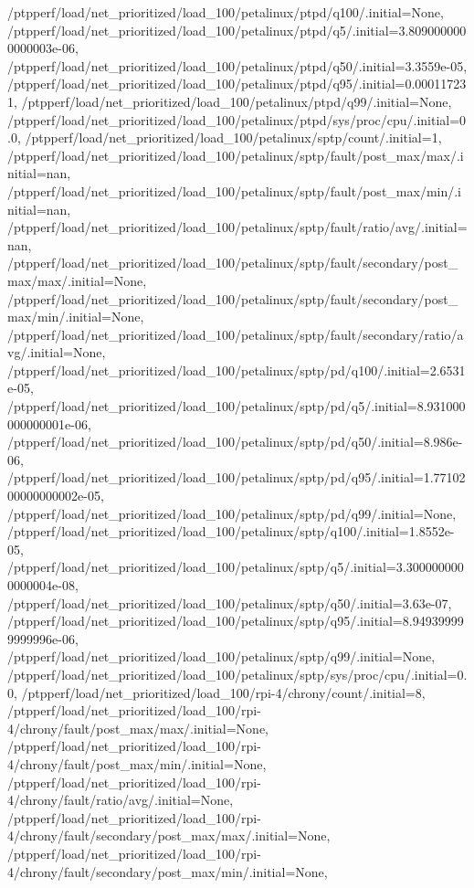 {    /ptpperf/load/net_prioritized/load_100/petalinux/ptpd/q100/.initial=None,
    /ptpperf/load/net_prioritized/load_100/petalinux/ptpd/q5/.initial=3.8090000000000003e-06,
    /ptpperf/load/net_prioritized/load_100/petalinux/ptpd/q50/.initial=3.3559e-05,
    /ptpperf/load/net_prioritized/load_100/petalinux/ptpd/q95/.initial=0.000117231,
    /ptpperf/load/net_prioritized/load_100/petalinux/ptpd/q99/.initial=None,
    /ptpperf/load/net_prioritized/load_100/petalinux/ptpd/sys/proc/cpu/.initial=0.0,
    /ptpperf/load/net_prioritized/load_100/petalinux/sptp/count/.initial=1,
    /ptpperf/load/net_prioritized/load_100/petalinux/sptp/fault/post_max/max/.initial=nan,
    /ptpperf/load/net_prioritized/load_100/petalinux/sptp/fault/post_max/min/.initial=nan,
    /ptpperf/load/net_prioritized/load_100/petalinux/sptp/fault/ratio/avg/.initial=nan,
    /ptpperf/load/net_prioritized/load_100/petalinux/sptp/fault/secondary/post_max/max/.initial=None,
    /ptpperf/load/net_prioritized/load_100/petalinux/sptp/fault/secondary/post_max/min/.initial=None,
    /ptpperf/load/net_prioritized/load_100/petalinux/sptp/fault/secondary/ratio/avg/.initial=None,
    /ptpperf/load/net_prioritized/load_100/petalinux/sptp/pd/q100/.initial=2.6531e-05,
    /ptpperf/load/net_prioritized/load_100/petalinux/sptp/pd/q5/.initial=8.931000000000001e-06,
    /ptpperf/load/net_prioritized/load_100/petalinux/sptp/pd/q50/.initial=8.986e-06,
    /ptpperf/load/net_prioritized/load_100/petalinux/sptp/pd/q95/.initial=1.7710200000000002e-05,
    /ptpperf/load/net_prioritized/load_100/petalinux/sptp/pd/q99/.initial=None,
    /ptpperf/load/net_prioritized/load_100/petalinux/sptp/q100/.initial=1.8552e-05,
    /ptpperf/load/net_prioritized/load_100/petalinux/sptp/q5/.initial=3.3000000000000004e-08,
    /ptpperf/load/net_prioritized/load_100/petalinux/sptp/q50/.initial=3.63e-07,
    /ptpperf/load/net_prioritized/load_100/petalinux/sptp/q95/.initial=8.949399999999996e-06,
    /ptpperf/load/net_prioritized/load_100/petalinux/sptp/q99/.initial=None,
    /ptpperf/load/net_prioritized/load_100/petalinux/sptp/sys/proc/cpu/.initial=0.0,
    /ptpperf/load/net_prioritized/load_100/rpi-4/chrony/count/.initial=8,
    /ptpperf/load/net_prioritized/load_100/rpi-4/chrony/fault/post_max/max/.initial=None,
    /ptpperf/load/net_prioritized/load_100/rpi-4/chrony/fault/post_max/min/.initial=None,
    /ptpperf/load/net_prioritized/load_100/rpi-4/chrony/fault/ratio/avg/.initial=None,
    /ptpperf/load/net_prioritized/load_100/rpi-4/chrony/fault/secondary/post_max/max/.initial=None,
    /ptpperf/load/net_prioritized/load_100/rpi-4/chrony/fault/secondary/post_max/min/.initial=None,
}
